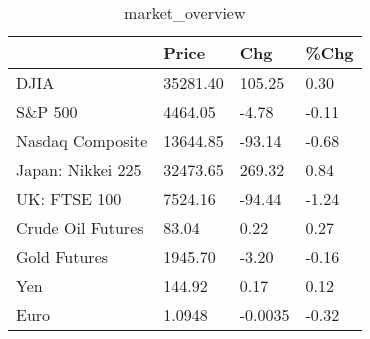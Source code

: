 \documentclass{article}%
\begin{document}
%


\begin{table}[htbp]%
\caption{market\_overview}%
\centering%
\begin{adjustbox}{width=1\textwidth}%
\begin{tabular}{llll}
\toprule
                  &    Price &     Chg &  \%Chg \\
\midrule
             DJIA & 35281.40 &  105.25 &  0.30 \\
          S\&P 500 &  4464.05 &   -4.78 & -0.11 \\
 Nasdaq Composite & 13644.85 &  -93.14 & -0.68 \\
Japan: Nikkei 225 & 32473.65 &  269.32 &  0.84 \\
     UK: FTSE 100 &  7524.16 &  -94.44 & -1.24 \\
Crude Oil Futures &    83.04 &    0.22 &  0.27 \\
     Gold Futures &  1945.70 &   -3.20 & -0.16 \\
              Yen &   144.92 &    0.17 &  0.12 \\
             Euro &   1.0948 & -0.0035 & -0.32 \\
\bottomrule
\end{tabular}
%
\end{adjustbox}%
\end{table}

%
\end{document}

